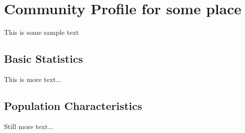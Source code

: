 \documentclass[11pt]{report}
\begin{document}
\section{Community Profile for some place}

This is some sample text

\subsection{Basic Statistics}
This is more text...

\subsection{Population Characteristics}
Still more text...
\end{document}
